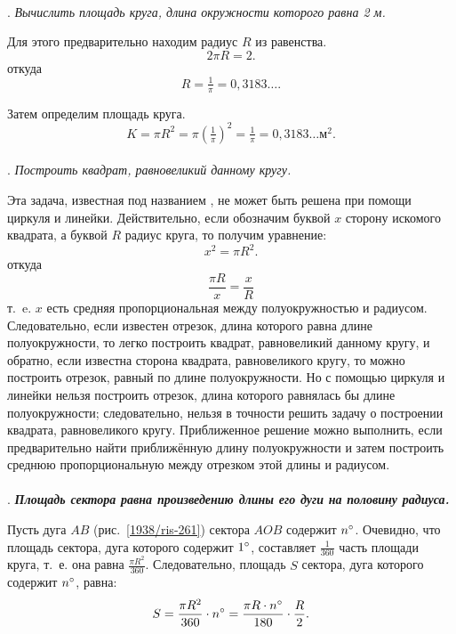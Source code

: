 \documentclass[oneside]{book}
\begin{document}
\paragraph{}\label{1938/266}
.
\emph{Вычислить площадь круга, длина окружности которого равна 2 м.}

Для этого предварительно находим радиус $R$ из равенства.
\[2\pi R= 2.\]
откуда
\[R=\tfrac1\pi=0{,}3183\dots.\]

Затем определим площадь круга.
\[K=\pi R^2=\pi(\tfrac1\pi)^2=\tfrac1\pi=0{,}3183\dots\text{м}^2.\]

\paragraph{}\label{1938/267}
.
\emph{Построить квадрат, равновеликий данному кругу.}

Эта задача, известная под названием , не может быть решена при помощи циркуля и линейки.
Действительно, если обозначим буквой $x$ сторону искомого квадрата, а буквой $R$ радиус круга, то получим уравнение:
\[x^2=\pi R^2.\]
откуда
\[\frac{\pi R}{x}=\frac{x}{R}\]
т.~e.
$x$ есть средняя пропорциональная между полуокружностью и радиусом.
Следовательно, если известен отрезок, длина которого равна длине полуокружности, то легко построить квадрат, равновеликий данному кругу, и обратно, если известна сторона квадрата, равновеликого кругу, то можно построить отрезок, равный по длине полуокружности.
Но с помощью циркуля и линейки нельзя построить отрезок, длина которого равнялась бы длине полуокружности; %
следовательно, нельзя в точности решить задачу о построении квадрата, равновеликого кругу.
Приближенное решение можно выполнить, если предварительно найти приближённую длину полуокружности и затем построить среднюю пропорциональную между отрезком этой длины и радиусом.

\paragraph{}\label{1938/268}
\mbox{.}
\textbf{\emph{Площадь сектора равна произведению длины его дуги на половину радиуса.}}

Пусть дуга $AB$ (рис.~\ref{1938/ris-261}) сектора $AOB$ содержит $n\degree$.
Очевидно, что площадь сектора, дуга которого содержит $1\degree$, составляет $\tfrac1{360}$ часть площади круга, т.~е. она равна $\frac{\pi R^2}{360}$.
Следовательно, площадь $S$ сектора, дуга которого содержит $n\degree$, равна:
\[S=\frac{\pi R^2}{360}\cdot n\degree=\frac{\pi R\cdot  n\degree}{180}\cdot \frac R2.\]
\end{document}
